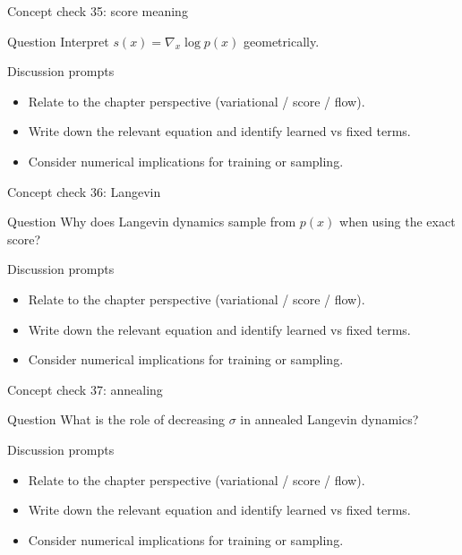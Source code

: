 \documentclass[aspectratio=169]{beamer}
\begin{document}
\begin{frame}{Concept check 35: score meaning}
\begin{block}{Question}
Interpret \(s(x)=\nabla_x\log p(x)\) geometrically.
\end{block}
\begin{block}{Discussion prompts}
\begin{itemize}
\item Relate to the chapter perspective (variational / score / flow).
\item Write down the relevant equation and identify learned vs fixed terms.
\item Consider numerical implications for training or sampling.
\end{itemize}
\end{block}
\end{frame}

\begin{frame}{Concept check 36: Langevin}
\begin{block}{Question}
Why does Langevin dynamics sample from \(p(x)\) when using the exact score?
\end{block}
\begin{block}{Discussion prompts}
\begin{itemize}
\item Relate to the chapter perspective (variational / score / flow).
\item Write down the relevant equation and identify learned vs fixed terms.
\item Consider numerical implications for training or sampling.
\end{itemize}
\end{block}
\end{frame}

\begin{frame}{Concept check 37: annealing}
\begin{block}{Question}
What is the role of decreasing \(\sigma\) in annealed Langevin dynamics?
\end{block}
\begin{block}{Discussion prompts}
\begin{itemize}
\item Relate to the chapter perspective (variational / score / flow).
\item Write down the relevant equation and identify learned vs fixed terms.
\item Consider numerical implications for training or sampling.
\end{itemize}
\end{block}
\end{frame}
\end{document}
